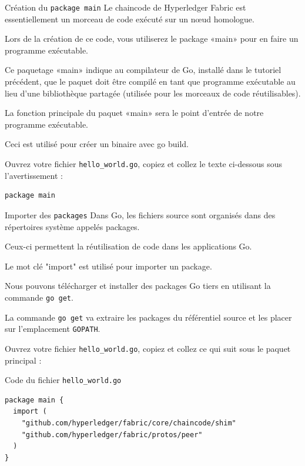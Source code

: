 \documentclass[presentation]{beamer}
\begin{document}
\begin{frame}[fragile,label={sec:org1c16f99}]{Création du \texttt{package main}}
 Le chaincode de Hyperledger Fabric est essentiellement un morceau de code exécuté sur un nœud homologue. 

Lors de la création de ce code, vous utiliserez le package «main» pour en faire un programme exécutable. 

Ce paquetage «main» indique au compilateur de Go, installé dans le tutoriel précédent, que le paquet doit 
être compilé en tant que programme exécutable au lieu d’une bibliothèque partagée (utilisée pour les 
morceaux de code réutilisables).

La fonction principale du paquet «main» sera le point d’entrée de notre programme exécutable. 

Ceci est utilisé pour créer un binaire avec go build.

Ouvrez votre fichier \texttt{hello\_world.go}, copiez et collez le texte ci-dessous sous l'avertissement :

\begin{verbatim}
package main
\end{verbatim}
\end{frame}
\begin{frame}[fragile,label={sec:orgdb1e7e0}]{Importer des \texttt{packages}}
 Dans Go, les fichiers source sont organisés dans des répertoires système appelés packages. 

Ceux-ci permettent la réutilisation de code dans les applications Go. 

Le mot clé "import" est utilisé pour importer un package. 

Nous pouvons télécharger et installer des packages Go tiers en utilisant la commande \texttt{go get}. 

La commande \texttt{go get} va extraire les packages du référentiel source et les placer sur l'emplacement \texttt{GOPATH}.

Ouvrez votre fichier \texttt{hello\_world.go}, copiez et collez ce qui suit sous le paquet principal :
\end{frame}
\begin{frame}[fragile,label={sec:org9ab8b84}]{Code du fichier \texttt{hello\_world.go}}
 \begin{verbatim}
package main {
  import (
	"github.com/hyperledger/fabric/core/chaincode/shim"
	"github.com/hyperledger/fabric/protos/peer"
  )
}
\end{verbatim}
\end{frame}
\end{document}
